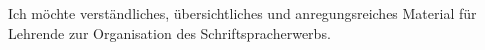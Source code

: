 Ich möchte verständliches, übersichtliches und anregungsreiches Material für Lehrende zur Organisation des Schriftspracherwerbs.